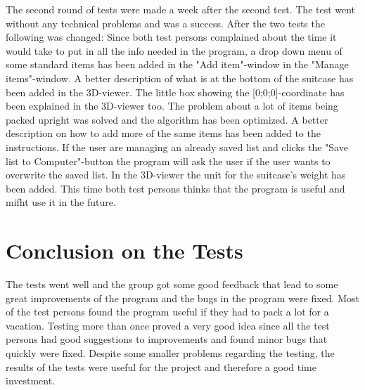 The second round of tests were made a week after the second test. The test went without any technical problems and was a success. After the two tests the following was changed: Since both test persons complained about the time it would take to put in all the info needed in the program, a drop down menu of some standard items has been added in the "Add item"-window in the "Manage items"-window. A better description of what is at the bottom of the suitcase has been added in the 3D-viewer. The little box showing the [0;0;0]-coordinate has been explained in the 3D-viewer too. The problem about a lot of items being packed upright was solved and the algorithm has been optimized. A better description on how to add more of the same items has been added to the instructions. If the user are managing an already saved list and clicks the "Save list to Computer"-button the program will ask the user if the user wants to overwrite the saved list. In the 3D-viewer the unit for the suitcase's weight has been added. This time both test persons thinks that the program is useful and mifht use it in the future.

\section{Conclusion on the Tests}
The tests went well and the group got some good feedback that lead to some great improvements of the program and the bugs in the program were fixed. Most of the test persons found the program useful if they had to pack a lot for a vacation. Testing more than once proved a very good idea since all the test persons had good suggestions to improvements and found minor bugs that quickly were fixed. Despite some smaller problems regarding the testing, the results of the tests were useful for the project and therefore a good time investment.